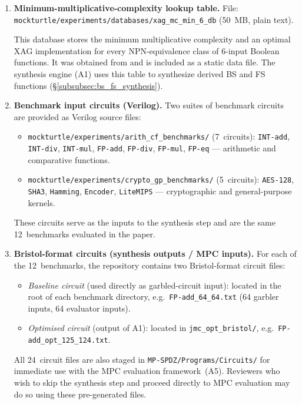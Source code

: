 \begin{enumerate}[leftmargin=*, label=\textbf{A\arabic*.}, itemsep=2pt]
  The synthesis tool is built on mockturtle~\cite{soeken2019mockturtle},
  an open-source C++ logic-synthesis library (MIT Licence).

\item \textbf{Minimum-multiplicative-complexity lookup table.}
  File: \texttt{mockturtle/experiments/databases/xag\_mc\_min\_6\_db}
  (50~MB, plain text).

  This database stores the minimum multiplicative complexity and an
  optimal XAG implementation for every NPN-equivalence class of 6-input
  Boolean functions.  It was obtained from \cite{testa2020mc} and is
  included as a static data file.
  The synthesis engine (A1) uses this table to synthesize derived BS and
  FS functions (\S\ref{subsubsec:bs_fs_synthesis}).

\item \textbf{Benchmark input circuits (Verilog).}
  Two suites of benchmark circuits are provided as Verilog source files:
  \begin{itemize}[nosep]
    \item \texttt{mockturtle/experiments/arith\_cf\_benchmarks/}
      (7~circuits): \texttt{INT-add}, \texttt{INT-div}, \texttt{INT-mul},
      \texttt{FP-add}, \texttt{FP-div}, \texttt{FP-mul}, \texttt{FP-eq} —
      arithmetic and comparative functions.
    \item \texttt{mockturtle/experiments/crypto\_gp\_benchmarks/}
      (5~circuits): \texttt{AES-128}, \texttt{SHA3}, \texttt{Hamming},
      \texttt{Encoder}, \texttt{LiteMIPS} — cryptographic and
      general-purpose kernels.
  \end{itemize}
  These circuits serve as the inputs to the synthesis step and are the same
  12~benchmarks evaluated in the paper.

\item \textbf{Bristol-format circuits (synthesis outputs / MPC inputs).}
  For each of the 12~benchmarks, the repository contains two
  Bristol-format circuit files:
  \begin{itemize}[nosep]
    \item \emph{Baseline circuit} (used directly as garbled-circuit input):
      located in the root of each benchmark directory, e.g.\
      \texttt{FP-add\_64\_64.txt} (64 garbler inputs, 64 evaluator inputs).
    \item \emph{Optimised circuit} (output of A1):
      located in \texttt{jmc\_opt\_bristol/}, e.g.\
      \texttt{FP-add\_opt\_125\_124.txt}.
  \end{itemize}
  All 24~circuit files are also staged in
  \texttt{MP-SPDZ/Programs/Circuits/} for immediate use with the MPC
  evaluation framework~(A5).  Reviewers who wish to skip the synthesis
  step and proceed directly to MPC evaluation may do so using these
  pre-generated files.


\end{enumerate}
